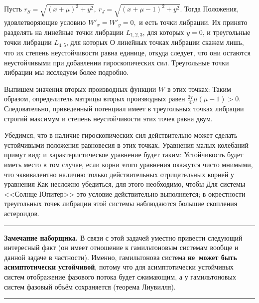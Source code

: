 \documentclass[a4paper,12pt]{article}
\newenvironment{nbb}{\par\vskip3pt\hrule\vskip3pt\textbf{\footnotesize Замечание наборщика.}\footnotesize }
{\vskip3pt\hrule\par\vskip3pt}
\begin{document}
Пусть  $r_S=\sqrt{(x+\mu)^2+y^2},\ r_J=\sqrt{(x+\mu-1)^2+y^2}$. Тогда
 Положения, удовлетворяющие
условию $W'_x=W'_y=0,$ и есть точки либрации. Их принято разделять на линейные точки либрации
$L_{1,2,3}$, для которых $y=0$, и треугольные точки либрации $L_{4,5}$, для которых
 О линейных точках либрации скажем лишь,
что их степень неустойчивости равна единице, откуда следует, что они остаются неустойчивыми при
добавлении гироскопических сил. Треугольные точки либрации мы исследуем более подробно.

Выпишем значения вторых производных функции $W$ в этих точках:
Таким образом, определитель
матрицы вторых производных равен $\frac{27}{4}\mu(\mu-1)>0$. Следовательно, приведенный потенциал
имеет в треугольных точках либрации строгий максимум и степень неустойчивости этих точек равна
двум.

Убедимся, что в наличие гироскопических сил действительно может сделать устойчивыми положения
равновесия в этих точках. Уравнения малых колебаний примут вид:
и характеристическое уравнение будет таким:
Устойчивость будет иметь место в том случае, если корни этого уравнения окажутся чисто мнимыми, что
эквивалентно наличию только действительных отрицательных корней у уравнения
 Как несложно убедиться, для этого необходимо, чтобы
 Для системы <<Солнце Юпитер>> это условие действительно выполняется; в
окрестности треугольных точек либрации этой системы наблюдаются большие скопления астероидов.

\begin{nbb}
В связи с этой задачей уместно привести следующий интересный факт (он имеет отношение
к гамильтоновым системам вообще и данной задаче в частности). Именно, гамильтонова система
\textbf{не~может быть асимптотически устойчивой}, потому что для асимптотически устойчивых систем
отображение фазового потока будет сжимающим, а у гамильтоновых систем фазовый объём сохраняется
(теорема Лиувилля).
\end{nbb}
\end{document}
